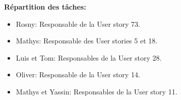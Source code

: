 \documentclass[11pt]{article}
\begin{document}
\textbf{Répartition des tâches:}
\begin{itemize}
    \item Rosny: Responsable de la User story 73.
    \item Mathys: Responsable des User stories 5 et 18.
    \item Luis et Tom: Responsables de la User story 28.
    \item Oliver: Responsable de la User story 14.
    \item Mathys et Yassin: Responsables de la User story 11.
\end{itemize}
\end{document}
